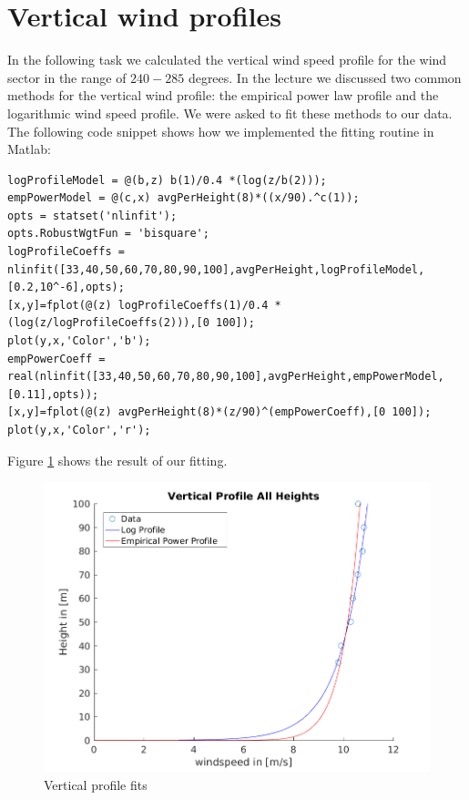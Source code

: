 \documentclass[10pt]{article}
\begin{document}
\section{Vertical wind profiles}
In the following task we calculated the vertical wind speed profile for the wind sector in the range of $240 - 285$ degrees. In the lecture we discussed two common methods for the vertical wind profile: the empirical power law profile and the logarithmic wind speed profile. We were asked to fit these methods to our data. The following code snippet shows how we implemented the fitting routine in Matlab:

\begin{lstlisting}
logProfileModel = @(b,z) b(1)/0.4 *(log(z/b(2)));
empPowerModel = @(c,x) avgPerHeight(8)*((x/90).^c(1));
opts = statset('nlinfit');
opts.RobustWgtFun = 'bisquare';
logProfileCoeffs = nlinfit([33,40,50,60,70,80,90,100],avgPerHeight,logProfileModel,[0.2,10^-6],opts);
[x,y]=fplot(@(z) logProfileCoeffs(1)/0.4 *(log(z/logProfileCoeffs(2))),[0 100]);
plot(y,x,'Color','b');
empPowerCoeff = real(nlinfit([33,40,50,60,70,80,90,100],avgPerHeight,empPowerModel,[0.11],opts));
[x,y]=fplot(@(z) avgPerHeight(8)*(z/90)^(empPowerCoeff),[0 100]);
plot(y,x,'Color','r');
\end{lstlisting}

Figure \ref{fig:verticalfit} shows the result of our fitting.

\begin{figure}[H]
\centering
\includegraphics[width=0.7\linewidth]{../figures/verticalProfileFits.png}
\caption{Vertical profile fits}
\label{fig:verticalfit}
\end{figure}
\end{document}
